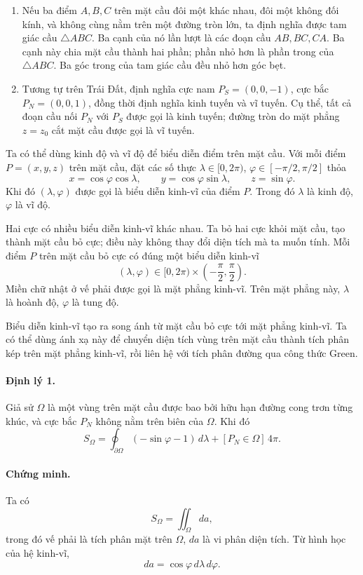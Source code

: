 \documentclass[11pt]{article}
\begin{document}
\begin{enumerate}
  \item Nếu ba điểm \(A,B,C\) trên mặt cầu đôi một khác nhau, đôi một không đối
  kính, và không cùng nằm trên một đường tròn lớn, ta định nghĩa được tam giác
  cầu \(\triangle ABC\). Ba cạnh của nó lần lượt là các đoạn cầu \(AB,BC,CA\).
  Ba cạnh này chia mặt cầu thành hai phần; phần nhỏ hơn là phần trong của
  \(\triangle ABC\). Ba góc trong của tam giác cầu đều nhỏ hơn góc bẹt.

  \item Tương tự trên Trái Đất, định nghĩa cực nam \(P_S=(0,0,-1)\), cực bắc
  \(P_N=(0,0,1)\), đồng thời định nghĩa kinh tuyến và vĩ tuyến. Cụ thể, tất cả
  đoạn cầu nối \(P_N\) với \(P_S\) được gọi là kinh tuyến; đường tròn do mặt
  phẳng \(z=z_0\) cắt mặt cầu được gọi là vĩ tuyến.
\end{enumerate}

Ta có thể dùng kinh độ và vĩ độ để biểu diễn điểm trên mặt cầu. Với mỗi điểm
\(P=(x,y,z)\) trên mặt cầu, đặt các số thực
\(\lambda\in[0,2\pi)\), \(\varphi\in[-\pi/2,\pi/2]\) thỏa
\[
  x=\cos\varphi\cos\lambda,\qquad
  y=\cos\varphi\sin\lambda,\qquad
  z=\sin\varphi.
\]
Khi đó \((\lambda,\varphi)\) được gọi là biểu diễn kinh-vĩ của điểm \(P\).
Trong đó \(\lambda\) là kinh độ, \(\varphi\) là vĩ độ.

Hai cực có nhiều biểu diễn kinh-vĩ khác nhau. Ta bỏ hai cực khỏi mặt cầu, tạo
thành mặt cầu bỏ cực; điều này không thay đổi diện tích mà ta muốn tính. Mỗi
điểm \(P\) trên mặt cầu bỏ cực có đúng một biểu diễn kinh-vĩ
\[
  (\lambda,\varphi)\in [0,2\pi)\times\left(-\frac{\pi}{2},\frac{\pi}{2}\right).
\]
Miền chữ nhật ở vế phải được gọi là mặt phẳng kinh-vĩ. Trên mặt phẳng này,
\(\lambda\) là hoành độ, \(\varphi\) là tung độ.

Biểu diễn kinh-vĩ tạo ra song ánh từ mặt cầu bỏ cực tới mặt phẳng kinh-vĩ. Ta
có thể dùng ánh xạ này để chuyển diện tích vùng trên mặt cầu thành tích phân
kép trên mặt phẳng kinh-vĩ, rồi liên hệ với tích phân đường qua công thức
Green.

\paragraph{Định lý 1.}
Giả sử \(\Omega\) là một vùng trên mặt cầu được bao bởi hữu hạn đường cong trơn
từng khúc, và cực bắc \(P_N\) không nằm trên biên của \(\Omega\). Khi đó
\[
  S_{\Omega}
  =
  \oint_{\partial\Omega}(-\sin\varphi-1)\,d\lambda
  +[P_N\in\Omega]\,4\pi.
\]

\paragraph{Chứng minh.}
Ta có
\[
  S_{\Omega}=\iint_{\Omega} da,
\]
trong đó vế phải là tích phân mặt trên \(\Omega\), \(da\) là vi phân diện
tích. Từ hình học của hệ kinh-vĩ,
\[
  da=\cos\varphi\,d\lambda\,d\varphi.
\]
\end{document}
